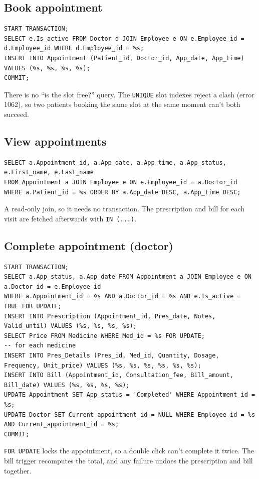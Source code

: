 \documentclass[11pt,a4paper]{article}
\newcommand{\code}[1]{\texttt{#1}}
\begin{document}
\subsection*{Book appointment}
\begin{lstlisting}[style=sql]
START TRANSACTION;
SELECT e.Is_active FROM Doctor d JOIN Employee e ON e.Employee_id = d.Employee_id WHERE d.Employee_id = %s;
INSERT INTO Appointment (Patient_id, Doctor_id, App_date, App_time) VALUES (%s, %s, %s, %s);
COMMIT;
\end{lstlisting}
There is no ``is the slot free?'' query. The \code{UNIQUE} slot indexes reject a clash (error 1062), so two patients booking the same slot at the same moment can't both succeed.

\subsection*{View appointments}
\begin{lstlisting}[style=sql]
SELECT a.Appointment_id, a.App_date, a.App_time, a.App_status, e.First_name, e.Last_name
FROM Appointment a JOIN Employee e ON e.Employee_id = a.Doctor_id
WHERE a.Patient_id = %s ORDER BY a.App_date DESC, a.App_time DESC;
\end{lstlisting}
A read-only join, so it needs no transaction. The prescription and bill for each visit are fetched afterwards with \code{IN (...)}.

\subsection*{Complete appointment (doctor)}
\begin{lstlisting}[style=sql]
START TRANSACTION;
SELECT a.App_status, a.App_date FROM Appointment a JOIN Employee e ON a.Doctor_id = e.Employee_id
WHERE a.Appointment_id = %s AND a.Doctor_id = %s AND e.Is_active = TRUE FOR UPDATE;
INSERT INTO Prescription (Appointment_id, Pres_date, Notes, Valid_until) VALUES (%s, %s, %s, %s);
SELECT Price FROM Medicine WHERE Med_id = %s FOR UPDATE;                         -- for each medicine
INSERT INTO Pres_Details (Pres_id, Med_id, Quantity, Dosage, Frequency, Unit_price) VALUES (%s, %s, %s, %s, %s, %s);
INSERT INTO Bill (Appointment_id, Consultation_fee, Bill_amount, Bill_date) VALUES (%s, %s, %s, %s);
UPDATE Appointment SET App_status = 'Completed' WHERE Appointment_id = %s;
UPDATE Doctor SET Current_appointment_id = NULL WHERE Employee_id = %s AND Current_appointment_id = %s;
COMMIT;
\end{lstlisting}
\code{FOR UPDATE} locks the appointment, so a double click can't complete it twice. The bill trigger recomputes the total, and any failure undoes the prescription and bill together.
\end{document}

